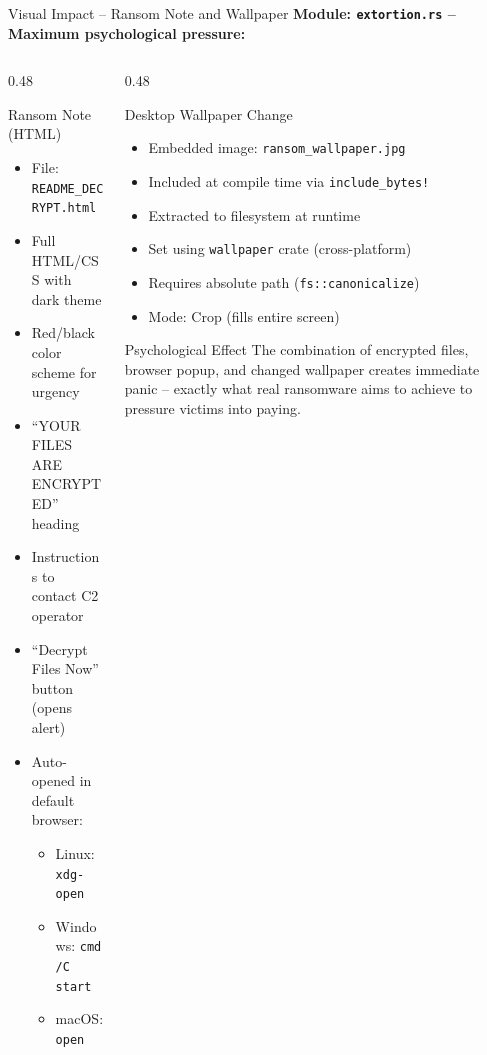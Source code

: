 \documentclass[aspectratio=169]{beamer}
\newcommand{\code}[1]{\texttt{\textcolor{primaryblue}{#1}}}
\begin{document}
\begin{frame}{Visual Impact -- Ransom Note and Wallpaper}
  \textbf{Module: \code{extortion.rs} -- Maximum psychological pressure:}

  \vspace{0.5em}
  \begin{columns}[T]
    \begin{column}{0.48\textwidth}
      \begin{block}{Ransom Note (HTML)}
        \footnotesize
        \begin{itemize}
          \item File: \code{README\_DECRYPT.html}
          \item Full HTML/CSS with dark theme
          \item Red/black color scheme for urgency
          \item ``YOUR FILES ARE ENCRYPTED'' heading
          \item Instructions to contact C2 operator
          \item ``Decrypt Files Now'' button (opens alert)
          \item Auto-opened in default browser:
          \begin{itemize}
            \item Linux: \code{xdg-open}
            \item Windows: \code{cmd /C start}
            \item macOS: \code{open}
          \end{itemize}
        \end{itemize}
      \end{block}
    \end{column}
    \begin{column}{0.48\textwidth}
      \begin{block}{Desktop Wallpaper Change}
        \footnotesize
        \begin{itemize}
          \item Embedded image: \code{ransom\_wallpaper.jpg}
          \item Included at compile time via \code{include\_bytes!}
          \item Extracted to filesystem at runtime
          \item Set using \code{wallpaper} crate (cross-platform)
          \item Requires absolute path (\code{fs::canonicalize})
          \item Mode: Crop (fills entire screen)
        \end{itemize}
      \end{block}

      \vspace{0.3em}
      \begin{warnbox}{Psychological Effect}
        The combination of encrypted files, browser popup, and changed wallpaper creates immediate panic -- exactly what real ransomware aims to achieve to pressure victims into paying.
      \end{warnbox}
    \end{column}
  \end{columns}
\end{frame}
\end{document}
